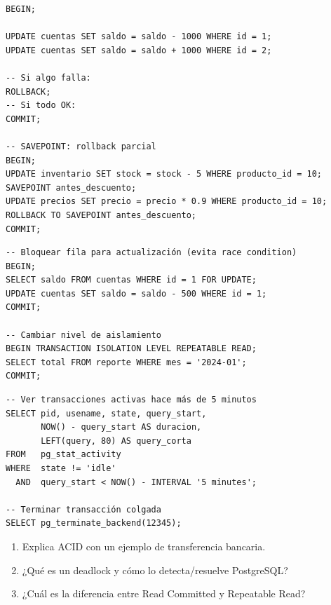 \begin{lstlisting}[caption={BEGIN, COMMIT, ROLLBACK, SAVEPOINT}]
BEGIN;

UPDATE cuentas SET saldo = saldo - 1000 WHERE id = 1;
UPDATE cuentas SET saldo = saldo + 1000 WHERE id = 2;

-- Si algo falla:
ROLLBACK;
-- Si todo OK:
COMMIT;

-- SAVEPOINT: rollback parcial
BEGIN;
UPDATE inventario SET stock = stock - 5 WHERE producto_id = 10;
SAVEPOINT antes_descuento;
UPDATE precios SET precio = precio * 0.9 WHERE producto_id = 10;
ROLLBACK TO SAVEPOINT antes_descuento;
COMMIT;
\end{lstlisting}

\begin{lstlisting}[caption={SELECT FOR UPDATE y nivel de aislamiento}]
-- Bloquear fila para actualización (evita race condition)
BEGIN;
SELECT saldo FROM cuentas WHERE id = 1 FOR UPDATE;
UPDATE cuentas SET saldo = saldo - 500 WHERE id = 1;
COMMIT;

-- Cambiar nivel de aislamiento
BEGIN TRANSACTION ISOLATION LEVEL REPEATABLE READ;
SELECT total FROM reporte WHERE mes = '2024-01';
COMMIT;
\end{lstlisting}

\begin{lstlisting}[caption={Detectar y matar conexiones colgadas}]
-- Ver transacciones activas hace más de 5 minutos
SELECT pid, usename, state, query_start,
       NOW() - query_start AS duracion,
       LEFT(query, 80) AS query_corta
FROM   pg_stat_activity
WHERE  state != 'idle'
  AND  query_start < NOW() - INTERVAL '5 minutes';

-- Terminar transacción colgada
SELECT pg_terminate_backend(12345);
\end{lstlisting}

\begin{entrevistabox}
\begin{enumerate}
  \item Explica ACID con un ejemplo de transferencia bancaria.
  \item ¿Qué es un deadlock y cómo lo detecta/resuelve PostgreSQL?
  \item ¿Cuál es la diferencia entre Read Committed y Repeatable Read?
\end{enumerate}
\end{entrevistabox}

